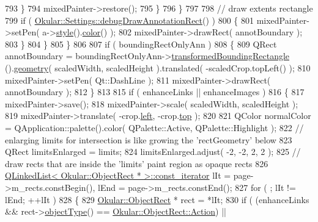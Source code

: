 \begin{DoxyCode}
793                     \}
794                     mixedPainter->restore();
795                 \}
796             \}
797 
798             \textcolor{comment}{// draw extents rectangle}
799             \textcolor{keywordflow}{if} ( \hyperlink{classOkular_1_1Settings_a2efc0bc534162c18db5c09c91e9b41fb}{Okular::Settings::debugDrawAnnotationRect}() )
800             \{
801                 mixedPainter->setPen( a->\hyperlink{classOkular_1_1Annotation_ae1f845ddbd6d524b2b388c6c9ef26423}{style}().\hyperlink{classOkular_1_1Annotation_1_1Style_a2c32cb2b41ef8732ddcd3d3dffc20b7d}{color}() );
802                 mixedPainter->drawRect( annotBoundary );
803             \}
804         \}
805     \}
806 
807     \textcolor{keywordflow}{if} ( boundingRectOnlyAnn )
808     \{
809         QRect annotBoundary = boundingRectOnlyAnn->\hyperlink{classOkular_1_1Annotation_a950ea9c7993878729eb4b6b0ea922436}{transformedBoundingRectangle}
      ().\hyperlink{classOkular_1_1NormalizedRect_a006897c5fcff2c3a97b4141f1a967513}{geometry}( scaledWidth, scaledHeight ).translated( -scaledCrop.topLeft() );
810         mixedPainter->setPen( Qt::DashLine );
811         mixedPainter->drawRect( annotBoundary );
812     \}
813 
815     \textcolor{keywordflow}{if} ( enhanceLinks || enhanceImages )
816     \{
817         mixedPainter->save();
818         mixedPainter->scale( scaledWidth, scaledHeight );
819         mixedPainter->translate( -crop.\hyperlink{classOkular_1_1NormalizedRect_a76336fe9d733f2b559cf8df3ef48f9e7}{left}, -crop.\hyperlink{classOkular_1_1NormalizedRect_acfb70f6417c993508d50090b512cb954}{top} );
820 
821         QColor normalColor = QApplication::palette().color( QPalette::Active, QPalette::Highlight );
822         \textcolor{comment}{// enlarging limits for intersection is like growing the 'rectGeometry' below}
823         QRect limitsEnlarged = limits;
824         limitsEnlarged.adjust( -2, -2, 2, 2 );
825         \textcolor{comment}{// draw rects that are inside the 'limits' paint region as opaque rects}
826         \hyperlink{classQLinkedList}{QLinkedList< Okular::ObjectRect * >::const\_iterator}
       lIt = page->m\_rects.constBegin(), lEnd = page->m\_rects.constEnd();
827         \textcolor{keywordflow}{for} ( ; lIt != lEnd; ++lIt )
828         \{
829             \hyperlink{classOkular_1_1ObjectRect}{Okular::ObjectRect} * rect = *lIt;
830             \textcolor{keywordflow}{if} ( (enhanceLinks && rect->\hyperlink{classOkular_1_1ObjectRect_a1c61e4737530a2c15ad93c8764917a14}{objectType}() == 
      \hyperlink{classOkular_1_1ObjectRect_a2f77f7653306bae90bfb68277aaafe16a2ad02138861dfdc8bc2a0c29bae5bed2}{Okular::ObjectRect::Action}) ||

\end{DoxyCode}
